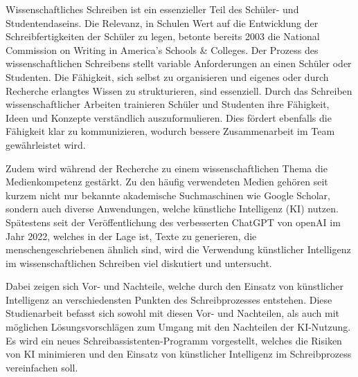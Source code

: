 \documentclass[../main.tex]{subfiles}
\begin{document}
Wissenschaftliches Schreiben ist ein essenzieller Teil des Schüler- und Studentendaseins. 
Die Relevanz, in Schulen Wert auf die Entwicklung der Schreibfertigkeiten der Schüler zu legen, betonte bereits 2003 
die National Commission on Writing in America’s Schools \& Colleges.  Der Prozess des 
wissenschaftlichen Schreibens stellt variable Anforderungen an einen Schüler oder Studenten. Die Fähigkeit, sich selbst zu organisieren und 
eigenes oder durch Recherche erlangtes Wissen zu strukturieren, sind essenziell. Durch das Schreiben 
wissenschaftlicher Arbeiten trainieren Schüler und Studenten ihre Fähigkeit, Ideen und Konzepte verständlich 
auszuformulieren. Dies fördert ebenfalls die Fähigkeit klar zu kommunizieren, wodurch bessere Zusammenarbeit 
im Team gewährleistet wird.  

Zudem wird während der Recherche zu einem wissenschaftlichen Thema die Medienkompetenz gestärkt. Zu den häufig 
verwendeten Medien gehören seit kurzem nicht nur bekannte akademische Suchmaschinen wie Google Scholar, sondern auch 
diverse Anwendungen, welche künstliche Intelligenz (KI) nutzen. Spätestens seit der Veröffentlichung des verbesserten ChatGPT von openAI im Jahr 2022, welches in der 
Lage ist, Texte zu generieren, die menschengeschriebenen ähnlich sind, wird die Verwendung künstlicher Intelligenz 
im wissenschaftlichen Schreiben viel diskutiert und untersucht.\cite{humanWritingToAi}

Dabei zeigen sich Vor- und Nachteile, welche durch den Einsatz von künstlicher Intelligenz an verschiedensten Punkten des Schreibprozesses entstehen. 
Diese Studienarbeit befasst sich sowohl mit diesen Vor- und Nachteilen, als auch mit möglichen
Lösungsvorschlägen zum Umgang mit den Nachteilen der KI-Nutzung. Es wird ein neues Schreibassistenten-Programm vorgestellt, welches die Risiken 
von KI minimieren und den Einsatz von künstlicher Intelligenz im Schreibprozess vereinfachen soll.
\end{document}
